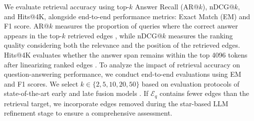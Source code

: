 \begin{table}[t]
    \centering
    \setlength{\tabcolsep}{2pt}
    \vspace{-3mm}
    \caption{
        Retrieval and end-to-end QA accuracy on the \texttt{MMQA} dev set.
    }
    \label{tab:mmqa_retrieval_accuracy} 
\end{table}


We evaluate retrieval accuracy using top-$k$ Answer Recall (AR@$k$), nDCG@$k$, and Hits@4K, alongside end-to-end performance metrics: Exact Match (EM) and F1 score. 
AR@$k$ measures the proportion of queries where the correct answer appears in the top-$k$ retrieved edges \citep{COS}, while nDCG@$k$ measures the ranking quality considering both the relevance and the position of the retrieved edges. 
Hits@4K evaluates whether the answer span remains within the top 4096 tokens after linearizing ranked edges \citep{OTT-QA}.
To analyze the impact of retrieval accuracy on question-answering performance, we conduct end-to-end evaluations using EM and F1 scores.
We select $k \in \{2, 5, 10, 20, 50\}$ based on evaluation protocols of state-of-the-art early and late fusion models \citep{DoTTeR, COS}.
If $\mathcal{E}_q$ contains fewer edges than the retrieval target, we incorporate edges removed during the star-based LLM refinement stage to ensure a comprehensive assessment.


